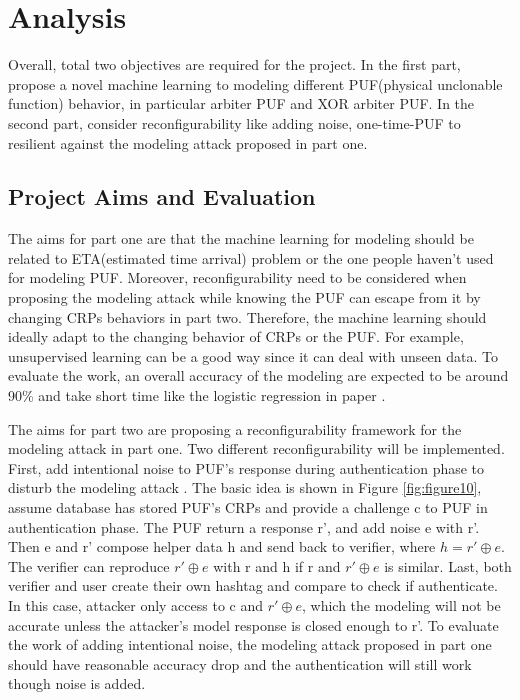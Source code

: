 \chapter{Analysis}
Overall, total two objectives are required for the project. In the first part, propose a novel machine learning to modeling different PUF(physical unclonable function)
behavior, in particular arbiter PUF and XOR arbiter PUF. In the second part, consider reconfigurability like adding noise, one-time-PUF to resilient against the modeling attack
proposed in part one.

\section{Project Aims and Evaluation}
The aims for part one are that the machine learning for modeling should be related to ETA(estimated time arrival) problem or the one people haven't used for modeling
PUF. Moreover, reconfigurability need to be considered when proposing the modeling attack while knowing the PUF can escape from it by changing CRPs behaviors in part 
two. Therefore, the machine learning should ideally adapt to the changing behavior of CRPs or the PUF. For example, unsupervised learning can be a good way since it can 
deal with unseen data. To evaluate the work, an overall accuracy of the modeling are expected to be around 90\% and take short time like the logistic regression in 
paper \cite{Reference6}.

The aims for part two are proposing a reconfigurability framework for the modeling attack in part one. Two different reconfigurability will be implemented. First, add intentional
noise to PUF's response during authentication phase to disturb the modeling attack \cite{Reference8}. The basic idea is shown in Figure \ref{fig:figure10}, assume database has stored PUF's CRPs and provide a challenge c
to PUF in authentication phase. The PUF return a response r', and add noise e with r'. Then e and r' compose helper data h and send back to verifier, where $h = r'\oplus e$. The verifier can reproduce $r'\oplus e$  
with r and h if r and $r'\oplus e$ is similar. Last, both verifier and user create their own hashtag and compare to check if authenticate. In this case, attacker only access to c and $r'\oplus e$, which the modeling
will not be accurate unless the attacker's model response is closed enough to r'. To evaluate the work of adding intentional noise, the modeling attack proposed in part one should have reasonable accuracy drop and the authentication will still work 
though noise is added.

